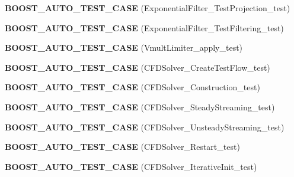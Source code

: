 \begin{DoxyCompactItemize}
\item 
\hypertarget{namespacenatrium_a1b95e965eb850eab92329ea18986a38d}{
{\bfseries BOOST\_\-AUTO\_\-TEST\_\-CASE} (ExponentialFilter\_\-TestProjection\_\-test)}
\label{namespacenatrium_a1b95e965eb850eab92329ea18986a38d}

\item 
\hypertarget{namespacenatrium_a1f58b59987be6e427484f1169f5398e6}{
{\bfseries BOOST\_\-AUTO\_\-TEST\_\-CASE} (ExponentialFilter\_\-TestFiltering\_\-test)}
\label{namespacenatrium_a1f58b59987be6e427484f1169f5398e6}

\item 
\hypertarget{namespacenatrium_a7d4dab2eb93c75d6f906ff7f3f56368f}{
{\bfseries BOOST\_\-AUTO\_\-TEST\_\-CASE} (VmultLimiter\_\-apply\_\-test)}
\label{namespacenatrium_a7d4dab2eb93c75d6f906ff7f3f56368f}

\item 
\hypertarget{namespacenatrium_a271d07a7da6606cbde36ee419b272cae}{
{\bfseries BOOST\_\-AUTO\_\-TEST\_\-CASE} (CFDSolver\_\-CreateTestFlow\_\-test)}
\label{namespacenatrium_a271d07a7da6606cbde36ee419b272cae}

\item 
\hypertarget{namespacenatrium_ac80f837d01c91dcae6c12c68137218dc}{
{\bfseries BOOST\_\-AUTO\_\-TEST\_\-CASE} (CFDSolver\_\-Construction\_\-test)}
\label{namespacenatrium_ac80f837d01c91dcae6c12c68137218dc}

\item 
\hypertarget{namespacenatrium_a12ba8ff19abf98381f5fa015c524a2f0}{
{\bfseries BOOST\_\-AUTO\_\-TEST\_\-CASE} (CFDSolver\_\-SteadyStreaming\_\-test)}
\label{namespacenatrium_a12ba8ff19abf98381f5fa015c524a2f0}

\item 
\hypertarget{namespacenatrium_acb3795cef35aaf5ceb1beddbe38498bb}{
{\bfseries BOOST\_\-AUTO\_\-TEST\_\-CASE} (CFDSolver\_\-UnsteadyStreaming\_\-test)}
\label{namespacenatrium_acb3795cef35aaf5ceb1beddbe38498bb}

\item 
\hypertarget{namespacenatrium_a919d8c6f9f1a0df849d52fc6b8bf3299}{
{\bfseries BOOST\_\-AUTO\_\-TEST\_\-CASE} (CFDSolver\_\-Restart\_\-test)}
\label{namespacenatrium_a919d8c6f9f1a0df849d52fc6b8bf3299}

\item 
\hypertarget{namespacenatrium_a91e709e65a2b694c19879df1aaea18bd}{
{\bfseries BOOST\_\-AUTO\_\-TEST\_\-CASE} (CFDSolver\_\-IterativeInit\_\-test)}
\label{namespacenatrium_a91e709e65a2b694c19879df1aaea18bd}


\end{DoxyCompactItemize}
